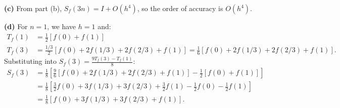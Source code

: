 \documentclass[reqno, answers]{exam}
\begin{document}
\begin{questions}
\begin{solution}
\textbf{(c)} From part (b), $S_f(3n) = I + O(h^4)$, so the order of accuracy is $O(h^4)$.

\textbf{(d)} For $n = 1$, we have $h = 1$ and:
\begin{align*}
T_f(1) &= \frac{1}{2}[f(0) + f(1)]\\
T_f(3) &= \frac{1/3}{2}[f(0) + 2f(1/3) + 2f(2/3) + f(1)] = \frac{1}{6}[f(0) + 2f(1/3) + 2f(2/3) + f(1)].
\end{align*}
Substituting into $S_f(3) = \frac{9T_f(3) - T_f(1)}{8}$:
\begin{align*}
S_f(3) &= \frac{1}{8}\left[\frac{9}{6}[f(0) + 2f(1/3) + 2f(2/3) + f(1)] - \frac{1}{2}[f(0) + f(1)]\right]\\
&= \frac{1}{8}\left[\frac{3}{2}f(0) + 3f(1/3) + 3f(2/3) + \frac{3}{2}f(1) - \frac{1}{2}f(0) - \frac{1}{2}f(1)\right]\\
&= \frac{1}{8}[f(0) + 3f(1/3) + 3f(2/3) + f(1)].
\end{align*}
\end{solution}





\end{questions}
\end{document}
